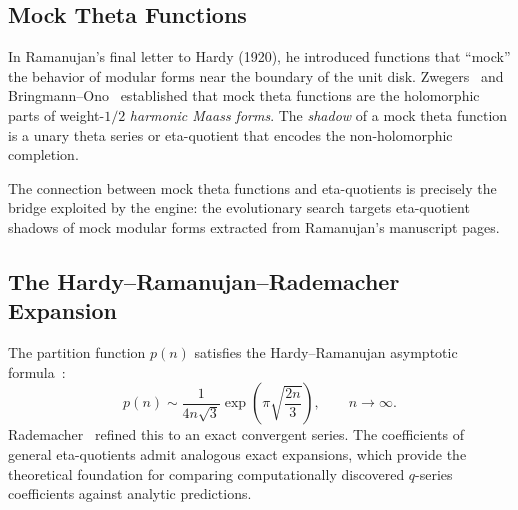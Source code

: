 \subsection{Mock Theta Functions}

\begin{definition}
In Ramanujan's final letter to Hardy (1920), he introduced
functions that ``mock'' the behavior of modular forms near
the boundary of the unit disk.  Zwegers~\cite{zwegers2002}
and Bringmann--Ono~\cite{bringmann_ono_2006} established that
mock theta functions are the holomorphic parts of
weight-$1/2$ \emph{harmonic Maass forms}.  The
\emph{shadow} of a mock theta function is a unary theta
series or eta-quotient that encodes the non-holomorphic
completion.
\end{definition}

\begin{remark}
The connection between mock theta functions and
eta-quotients is precisely the bridge exploited by the
\RAMA{} engine: the evolutionary search targets
eta-quotient shadows of mock modular forms extracted
from Ramanujan's manuscript pages.
\end{remark}

\subsection{The Hardy--Ramanujan--Rademacher Expansion}

The partition function $p(n)$ satisfies
the Hardy--Ramanujan asymptotic
formula~\cite{hardy_ramanujan_1918}:
\begin{equation}
  p(n) \sim \frac{1}{4n\sqrt{3}}
  \exp\left(\pi\sqrt{\frac{2n}{3}}\right),
  \qquad n \to \infty.
\end{equation}
Rademacher~\cite{rademacher_1937} refined this to an exact
convergent series.  The coefficients of general
eta-quotients admit analogous exact expansions, which
provide the theoretical foundation for comparing
computationally discovered $q$-series coefficients against
analytic predictions.
